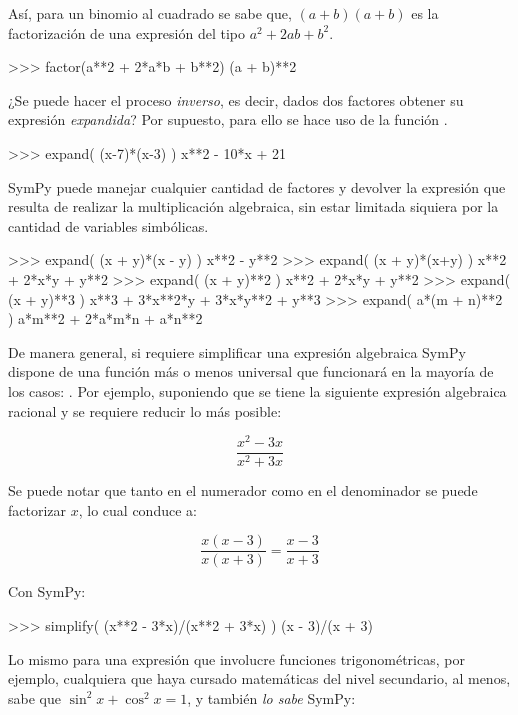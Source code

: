 Así, para un binomio al cuadrado se sabe que, $ (a+b)(a+b) $ es la factorización de una expresión del tipo
$ a^2 + 2ab + b^2 $.

\begin{python}
>>> factor(a**2 + 2*a*b + b**2)
(a + b)**2
\end{python}


¿Se puede hacer el proceso \textit{inverso}, es decir, dados dos factores obtener su expresión \textit{expandida}? 
Por supuesto, para ello se hace uso de la función . 

\begin{python}
>>> expand( (x-7)*(x-3) )
x**2 - 10*x + 21
\end{python}

SymPy puede manejar cualquier cantidad de factores y devolver la expresión que resulta de realizar la multiplicación 
algebraica, sin estar limitada siquiera por la cantidad de variables simbólicas.

\begin{python}
>>> expand( (x + y)*(x - y) )
x**2 - y**2
>>> expand( (x + y)*(x+y) )
x**2 + 2*x*y + y**2
>>> expand( (x + y)**2 )
x**2 + 2*x*y + y**2
>>> expand( (x + y)**3 )
x**3 + 3*x**2*y + 3*x*y**2 + y**3
>>> expand( a*(m + n)**2 )
a*m**2 + 2*a*m*n + a*n**2
\end{python}

De manera general, si requiere simplificar una expresión algebraica SymPy dispone de una función más o menos universal que funcionará en la mayoría de los casos: . Por ejemplo, suponiendo que 
se tiene la siguiente expresión algebraica racional y se requiere reducir lo más posible:

$$ \frac{x^2 - 3x}{x^2 + 3x}$$

Se puede notar que tanto en el numerador como en el denominador se puede factorizar $x$, lo cual conduce a:

$$ \frac{x(x - 3)}{x(x + 3)} = \frac{x-3}{x+3} $$

Con SymPy:

\begin{python}
>>> simplify( (x**2 - 3*x)/(x**2 + 3*x) )
(x - 3)/(x + 3)
\end{python}

Lo mismo para una expresión que involucre funciones trigonométricas, por ejemplo, cualquiera que haya cursado matemáticas 
del nivel secundario, al menos, sabe que $\sin^2 x + \cos^2 x = 1 $, y también \textit{lo sabe} SymPy:

